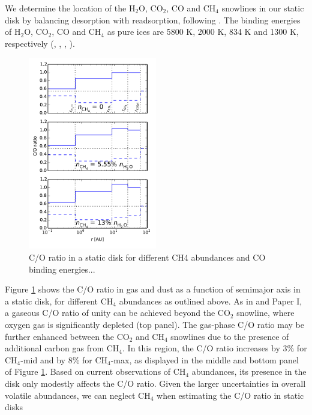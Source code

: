 \documentclass[apj]{emulateapj}
\begin{document}
We determine the location of the H$_2$O, CO$_2$, CO and CH$_4$ snowlines in our static disk by balancing desorption with readsorption, following \citet{hollenbach09}. The binding energies of H$_2$O, CO$_2$, CO and CH$_4$ as pure ices are 5800 K, 2000 K, 834 K and 1300 K, respectively (\citealt{fraser01}, \citealt{collings04}, \citealt{fayolle16}, \citealt{garrod06}).

\begin{figure}[h!]
\centering
\includegraphics[width=0.5\textwidth]{../../figs/C_O_ratio_CH4.pdf}
\caption{C/O ratio in a static disk for different CH4 abundances and CO binding energies...} 
\label{fig:COstatic}
\end{figure}

Figure \ref{fig:COstatic} shows the C/O ratio in gas and dust as a function of semimajor axis in a static disk, for different CH$_4$ abundances as outlined above. As in \citet{oberg11} and Paper I, a gaseous C/O ratio of unity can be achieved beyond the CO$_2$ snowline, where oxygen gas is significantly depleted (top panel). The gas-phase C/O ratio may be further enhanced between the CO$_2$ and CH$_4$ snowlines due to the presence of additional carbon gas from CH$_4$. In this region, the C/O ratio increases by 3\% for CH$_4$-mid and by 8\% for  CH$_4$-max, as displayed in the middle and bottom panel of Figure \ref{fig:COstatic}. Based on current observations of CH$_4$ abundances, its presence in the disk only modestly affects the C/O ratio. Given the larger uncertainties in overall volatile abundances, we can neglect CH$_4$ when estimating the C/O ratio in static disks %
\end{document}
